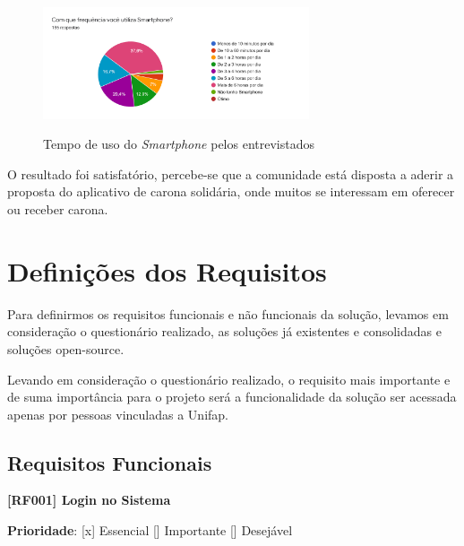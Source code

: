 \begin{figure}[!hbtp]
	\centering
	\caption{Tempo de uso do \textit{Smartphone} pelos entrevistados}
	\includegraphics[width=0.7\textwidth]{./04-figuras/questionario/17.png}
	\label{fig:usodosmartphone}
\end{figure}

O resultado foi satisfatório, percebe-se que a comunidade está disposta a aderir a proposta do aplicativo de carona solidária, onde muitos se interessam em oferecer ou receber carona. 

\section{Definições dos Requisitos}

Para definirmos os requisitos funcionais e não funcionais da solução, levamos em consideração o questionário realizado, as soluções já existentes e consolidadas e soluções open-source.

Levando em consideração o questionário realizado, o requisito mais importante e de suma importância para o projeto será a funcionalidade da solução ser acessada apenas por pessoas vinculadas a Unifap.







\subsection{Requisitos Funcionais}
\textbf{[RF001] Login no Sistema}

\textbf{Prioridade}:      [x] Essencial        [] Importante     [] Desejável 

